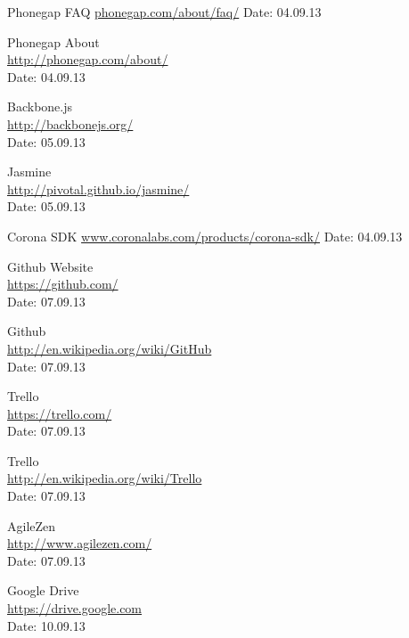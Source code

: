 \begin{thebibliography}{99}
	Phonegap FAQ\newline
	\href {http://phonegap.com/about/faq/}{phonegap.com/about/faq/}\newline
	Date: 04.09.13

	Phonegap About \\
	\href{http://phonegap.com/about/}{http://phonegap.com/about/} \\
	Date: 04.09.13

	Backbone.js \\
	\href{http://backbonejs.org/}{http://backbonejs.org/} \\
	Date: 05.09.13

	Jasmine \\ 
	\href{http://pivotal.github.io/jasmine/}{http://pivotal.github.io/jasmine/} \\
	Date: 05.09.13

	Corona SDK\newline
	\href {http://www.coronalabs.com/products/corona-sdk/}{www.coronalabs.com/products/corona-sdk/}\newline
	Date: 04.09.13

	Github Website\\
	\href{https://github.com/}{https://github.com/} \\
	Date: 07.09.13

	Github \\
	\href{http://en.wikipedia.org/wiki/GitHub}{http://en.wikipedia.org/wiki/GitHub} \\
	Date: 07.09.13

	Trello \\
	\href{https://trello.com/}{https://trello.com/} \\
	Date: 07.09.13

	Trello \\
	\href{http://en.wikipedia.org/wiki/Trello}{http://en.wikipedia.org/wiki/Trello} \\
	Date: 07.09.13

	AgileZen \\
	\href{http://www.agilezen.com/}{http://www.agilezen.com/} \\
	Date: 07.09.13

	Google Drive \\
	\href{https://drive.google.com}{https://drive.google.com} \\
	Date: 10.09.13


\end{thebibliography}
